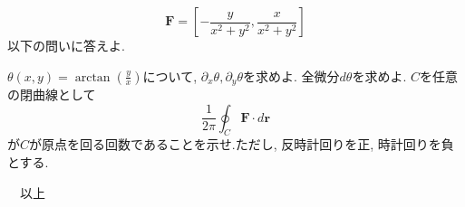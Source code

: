 \documentclass[a4j,dvipdfmx]{jsarticle}
\begin{document}
\begin{qparts}
\begin{equation*}
                \bm{F}=\left[-\frac{y}{x^2+y^2},\frac{x}{x^2+y^2}\right]
            \end{equation*}
            以下の問いに答えよ.
            \begin{qlist}
                \qitem $\theta(x,y)=\arctan\left(\frac{y}{x}\right)$について, $\partial_x \theta,\partial_y \theta$を求めよ.
                \qitem 全微分$d\theta$を求めよ.
                \qitem $C$を任意の閉曲線として
                    \begin{equation}
                        \frac{1}{2\pi}\oint_{C} \bm{F}\cdot d\bm{r}
                    \end{equation}
                    が$C$が原点を回る回数であることを示せ.ただし, 反時計回りを正, 時計回りを負とする.
            \end{qlist}
        \end{qparts}
    \hrulefill 　以上　\hrulefill
\end{document}
